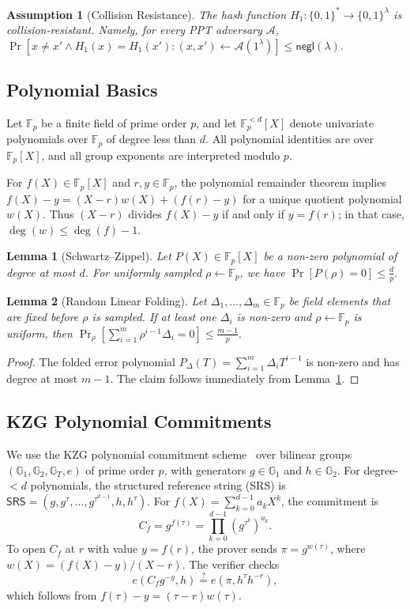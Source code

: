 \documentclass[lettersize,journal]{IEEEtran}
\newtheorem{assumption}{Assumption}
\newtheorem{lemma}{Lemma}
\newcommand{\GG}{\mathbb{G}}
\newcommand{\FF}{\mathbb{F}}
\newcommand{\SRS}{\mathsf{SRS}}
\begin{document}
\begin{assumption}[Collision Resistance]\label{ass:hash}
The hash function \(H_1:\{0,1\}^*\rightarrow\{0,1\}^{\lambda}\) is collision-resistant. Namely, for every PPT adversary \(\mathcal{A}\), $
    \Pr\!\left[
    x\neq x' \land H_1(x)=H_1(x')
    : (x,x')\leftarrow\mathcal{A}(1^\lambda)
    \right]\le \mathsf{negl}(\lambda).
$
\end{assumption}

\subsection{Polynomial Basics}

Let $\FF_p$ be a finite field of prime order $p$, and let $\FF_p^{<d}[X]$ denote univariate polynomials over $\FF_p$ of degree less than $d$. All polynomial identities are over $\FF_p[X]$, and all group exponents are interpreted modulo $p$.

For $f(X)\in\FF_p[X]$ and $r,y\in\FF_p$, the polynomial remainder theorem implies $f(X)-y=(X-r)w(X)+(f(r)-y)$
for a unique quotient polynomial $w(X)$. Thus $(X-r)$ divides $f(X)-y$ if and only if $y=f(r)$; in that case, $\deg(w)\le \deg(f)-1$.

\begin{lemma}[Schwartz--Zippel]\label{lem:schwartz_zippel}
Let $P(X)\in\FF_p[X]$ be a non-zero polynomial of degree at most $d$. For uniformly sampled $\rho\leftarrow\FF_p$, we have
    $\Pr[P(\rho)=0]\le \frac{d}{p}.$
\end{lemma}

\begin{lemma}[Random Linear Folding]\label{lem:random_linear_folding}
Let $\Delta_1,\ldots,\Delta_m\in\FF_p$ be field elements that are fixed before $\rho$ is sampled. If at least one $\Delta_i$ is non-zero and $\rho\leftarrow\FF_p$ is uniform, then
$\Pr_\rho\!\left[\sum_{i=1}^m \rho^{i-1}\Delta_i=0\right]\le \frac{m-1}{p}.$
\end{lemma}
\begin{proof}
The folded error polynomial $P_\Delta(T)=\sum_{i=1}^m \Delta_iT^{i-1}$ is non-zero and has degree at most $m-1$. The claim follows immediately from Lemma~\ref{lem:schwartz_zippel}.
\end{proof}



\subsection{KZG Polynomial Commitments}
We use the KZG polynomial commitment scheme~\cite{Kate2010KZG} over bilinear groups $(\GG_1,\GG_2,\GG_T,e)$ of prime order $p$, with generators $g\in\GG_1$ and $h\in\GG_2$. For degree-$<d$ polynomials, the structured reference string (SRS) is
\(\SRS=(g,g^\tau,\ldots,g^{\tau^{d-1}},h,h^\tau)\).
For \(f(X)=\sum_{k=0}^{d-1}a_kX^k\), the commitment is
\[
    C_f=g^{f(\tau)}=\prod_{k=0}^{d-1}(g^{\tau^k})^{a_k}.
\]
To open \(C_f\) at \(r\) with value \(y=f(r)\), the prover sends \(\pi=g^{w(\tau)}\), where \(w(X)=(f(X)-y)/(X-r)\). The verifier checks
\[
    e(C_f g^{-y},h)\stackrel{?}{=}e(\pi,h^\tau h^{-r}),
\]
which follows from \(f(\tau)-y=(\tau-r)w(\tau)\).
\end{document}
